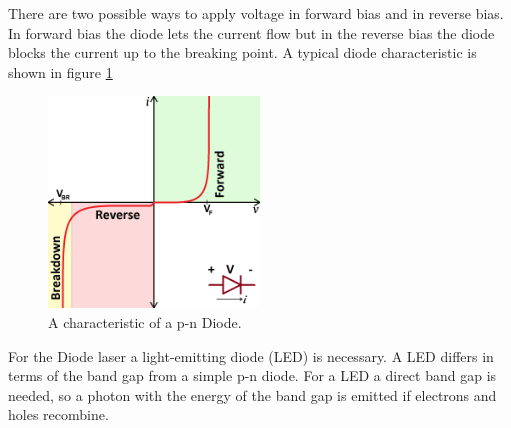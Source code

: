 There are two possible ways to apply voltage
in forward bias and
in reverse bias.
In forward bias the diode lets the current flow
but in the reverse bias the diode blocks the current up to the breaking point.
A typical diode characteristic is shown in figure \ref{fig:chara}
\begin{figure}
\centering
\includegraphics[width=0.5\textwidth]{Kennlinie.png}
\caption{A characteristic of a p-n Diode.
\cite{sparkfun}} %
\label{fig:chara}
\end{figure}
For the Diode laser a light-emitting diode (LED)
is necessary. A LED differs in terms of
the band gap
from a simple p-n diode.
For a LED a direct band gap is needed, so a photon
with the energy of the band gap is
emitted if electrons and holes recombine.

